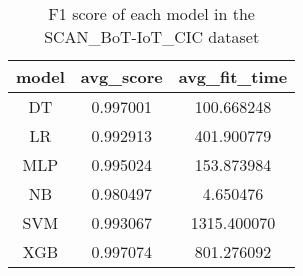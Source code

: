 \begin{table}[H]
\centering
\caption{F1 score of each model in the SCAN_BoT-IoT_CIC dataset}
\label{f1_valid_scan_bot-iot_cic}
\begin{tabular}{ccc}
\toprule
model &  avg\_score &  avg\_fit\_time \\
\midrule
   DT &   0.997001 &    100.668248 \\
   LR &   0.992913 &    401.900779 \\
  MLP &   0.995024 &    153.873984 \\
   NB &   0.980497 &      4.650476 \\
  SVM &   0.993067 &   1315.400070 \\
  XGB &   0.997074 &    801.276092 \\
\bottomrule
\end{tabular}
\end{table}
